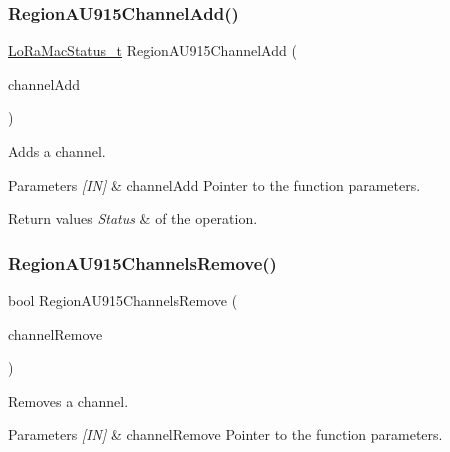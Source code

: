 \subsubsection{\texorpdfstring{Region\+A\+U915\+Channel\+Add()}{RegionAU915ChannelAdd()}}
{\footnotesize\ttfamily \hyperlink{group__LORAMAC_ga30bd25657e10480f8605ee951b0ecfbd}{Lo\+Ra\+Mac\+Status\+\_\+t} Region\+A\+U915\+Channel\+Add (\begin{DoxyParamCaption}\item[{\hyperlink{group__REGION_gab1c5f3aa06614283202906cef4417860}{Channel\+Add\+Params\+\_\+t} $\ast$}]{channel\+Add }\end{DoxyParamCaption})}



Adds a channel. 


\begin{DoxyParams}{Parameters}
{\em \mbox{[}\+I\+N\mbox{]}} & channel\+Add Pointer to the function parameters.\\
\hline
\end{DoxyParams}

\begin{DoxyRetVals}{Return values}
{\em Status} & of the operation. \\
\hline
\end{DoxyRetVals}
\mbox{\label{group__REGIONAU915_ga4dfd376f684a40c659c69bf127a71a71}} 
\subsubsection{\texorpdfstring{Region\+A\+U915\+Channels\+Remove()}{RegionAU915ChannelsRemove()}}
{\footnotesize\ttfamily bool Region\+A\+U915\+Channels\+Remove (\begin{DoxyParamCaption}\item[{\hyperlink{group__REGION_gaa37468560d2fc81a977b57a48e5d72c0}{Channel\+Remove\+Params\+\_\+t} $\ast$}]{channel\+Remove }\end{DoxyParamCaption})}



Removes a channel. 


\begin{DoxyParams}{Parameters}
{\em \mbox{[}\+I\+N\mbox{]}} & channel\+Remove Pointer to the function parameters.\\
\hline
\end{DoxyParams}

